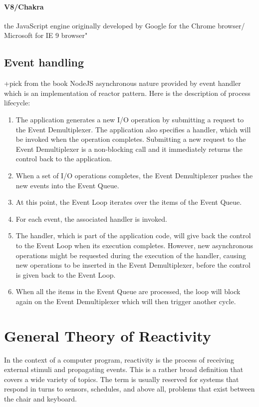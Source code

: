 \paragraph{V8/Chakra} the JavaScript engine originally developed by Google for the Chrome browser/ Microsoft for IE 9 browser"\cite{nodejsbook} 

\subsection{Event handling}
+pick from the book
NodeJS asynchronous nature provided by event handler which is an implementation of reactor pattern. Here is the description of process lifecycle\cite{nodejsbook}:
\begin{enumerate}
\item The application generates a new I/O operation by submitting a request to the Event Demultiplexer. The application also specifies a handler, which will be invoked when the operation completes. Submitting a new request to the Event Demultiplexer is a non-blocking call and it immediately returns the control back to the application.
\item When a set of I/O operations completes, the Event Demultiplexer pushes the new events into the Event Queue.
\item At this point, the Event Loop iterates over the items of the Event Queue.
\item For each event, the associated handler is invoked.
\item The handler, which is part of the application code, will give back the control to the Event Loop when its execution completes. However, new asynchronous operations might be requested during the execution of the handler, causing new operations to be inserted in the Event Demultiplexer, before the control is given back to the Event Loop.
\item When all the items in the Event Queue are processed, the loop will block again on the Event Demultiplexer which will then trigger another cycle.
\end{enumerate}

\section{General Theory of Reactivity}
In the context of a computer program, reactivity is the process of receiving external stimuli and propagating events. This is a rather broad definition that covers a wide variety of topics. The term is usually reserved for systems that respond in turns to sensors, schedules, and above all, problems that exist between the chair and keyboard.

